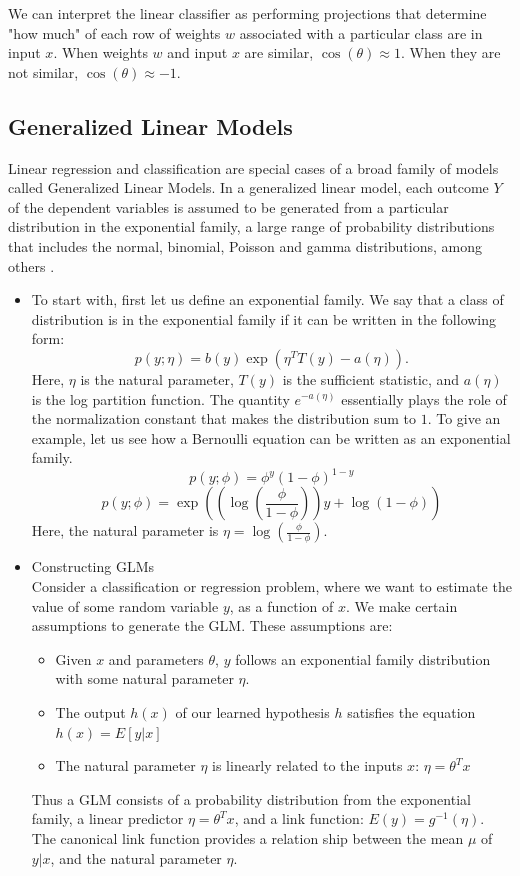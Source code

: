 \documentclass[twoside]{article}
\begin{document}
We can interpret the linear classifier as performing projections that determine "how much" of each row of weights $w$ associated with a particular class are in input $x$. When weights $w$ and input $x$ are similar, $\cos(\theta) \approx 1$. When they are not similar, $\cos(\theta) \approx -1$.



\subsection{Generalized Linear Models}
Linear regression and classification  are special cases of a broad family of models called Generalized Linear Models. In a generalized linear model, each outcome $Y$ of the dependent variables is assumed to be generated from a particular distribution in the exponential family, a large range of probability distributions that includes the normal, binomial, Poisson and gamma distributions, among others \cite{10.2307/2344614}. 

\begin{itemize}
\item To start with, first let us define an exponential family. We say that a class of distribution is in the exponential family if it can be written in the following form:
\[p(y;\eta) = b(y) \exp(\eta^T T(y) - a(\eta)).\] 
Here, $\eta$ is the natural parameter, $T(y)$ is the sufficient statistic, and $a(\eta)$ is the log partition function. The quantity $e^{-a(\eta)}$ essentially plays the role of the normalization constant that makes the distribution sum to $1$. To give an example, let us see how a Bernoulli equation can be written as an exponential family.
\[ p(y;\phi)  = \phi^y(1-\phi)^{1-y}\]
\[p(y;\phi)  = \exp \left(\left(\log \left(\frac{\phi}{1-\phi}\right)\right)y + \log(1-\phi) \right) \]
Here, the natural parameter is $\eta = \log \left(\frac{\phi}{1-\phi}\right)$.

\item Constructing GLMs \\
Consider a classification or regression problem, where we want to estimate the value of some random variable $y$, as a function of $x$. We make certain assumptions to generate the GLM. These assumptions are: 
\begin{itemize}
\item  Given $x$ and parameters $\theta$, $y$ follows an exponential family distribution with some natural parameter $\eta$.
\item The output $h(x)$ of our learned hypothesis $h$ satisfies the equation $h(x) = E[y|x]$
\item The natural parameter $\eta$ is linearly related to the inputs $x$: $\eta = \theta^Tx$
\end{itemize} 
Thus a GLM consists of a probability distribution from the exponential family, a linear predictor $\eta = \theta^Tx$, and a link function: $E(y) = g^{-1}(\eta)$. The canonical link function provides a relation ship between the mean $\mu$ of $y|x$, and the natural parameter $\eta$.

\end{itemize} 
\end{document}
